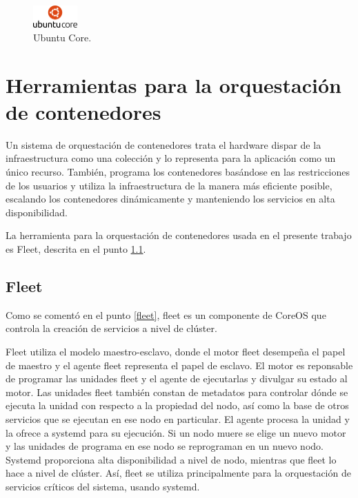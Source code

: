 \begin{figure}[H]
\centering
\includegraphics[width=0.15\textwidth]{images/figures/ubuntucore.jpg}
\caption{Ubuntu Core.\footnotemark}
\end{figure}


\section{Herramientas para la orquestación de contenedores} \label{sec:herramientas}

Un sistema de orquestación de contenedores trata el hardware dispar de la infraestructura como una colección y lo representa para la aplicación como un único recurso. También, programa los contenedores basándose en las restricciones de los usuarios y utiliza la infraestructura de la manera más eficiente posible, escalando los contenedores dinámicamente y manteniendo los servicios en alta disponibilidad.

La herramienta para la orquestación de contenedores usada en el presente trabajo es Fleet, descrita en el punto \ref{Fleet}.

\subsection{Fleet}\label{Fleet}

Como se comentó en el punto \ref{fleet}, fleet es un componente de CoreOS que controla la creación de servicios a nivel de clúster.

Fleet utiliza el modelo maestro-esclavo, donde el motor fleet desempeña el papel de maestro y el agente fleet representa el papel de esclavo. El motor es reponsable de programar las unidades fleet y el agente de ejecutarlas y divulgar su estado al motor. Las unidades fleet también constan de metadatos para controlar dónde se ejecuta la unidad con respecto a la propiedad del nodo, así como la base de otros servicios que se ejecutan en ese nodo en particular. El agente procesa la unidad y la ofrece a systemd para su ejecución. Si un nodo muere se elige un nuevo motor y las unidades de programa en ese nodo se reprograman en un nuevo nodo. Systemd proporciona alta disponibilidad a nivel de nodo, mientras que fleet lo hace a nivel de clúster. Así, fleet se utiliza principalmente para la orquestación de servicios críticos del sistema, usando systemd.

